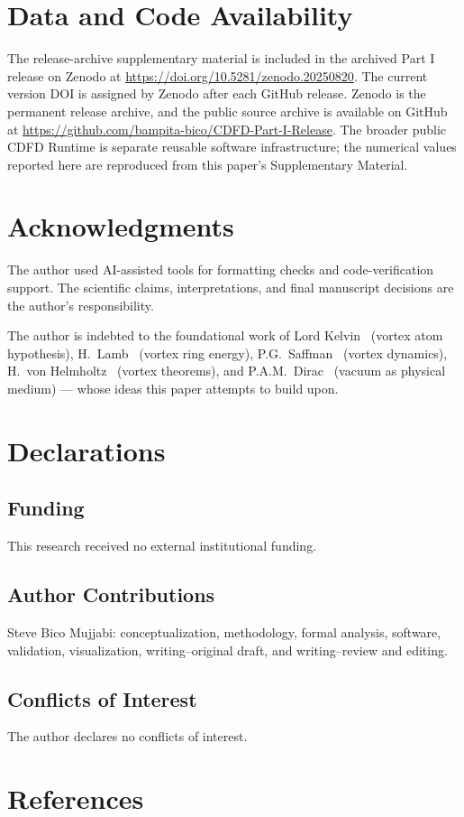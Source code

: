 \documentclass[11pt]{article}
\begin{document}
\section*{Data and Code Availability}

The release-archive supplementary material is included in the archived Part I
release on Zenodo at \url{https://doi.org/10.5281/zenodo.20250820}. The current version DOI is assigned by Zenodo after each GitHub release. Zenodo is the
permanent release archive, and the public source archive is available on GitHub at
\url{https://github.com/bampita-bico/CDFD-Part-I-Release}. The broader public CDFD
Runtime is separate reusable software infrastructure; the numerical values reported
here are reproduced from this paper's Supplementary Material.


\section*{Acknowledgments}
The author used AI-assisted tools for formatting checks and code-verification
support. The scientific claims, interpretations, and final manuscript decisions
are the author's responsibility.

The author is indebted to the foundational work of
Lord Kelvin~\cite{Thomson1867} (vortex atom hypothesis),
H.~Lamb~\cite{Lamb1932} (vortex ring energy),
P.G.~Saffman~\cite{Saffman1992} (vortex dynamics),
H.~von Helmholtz~\cite{Helmholtz1858} (vortex theorems),
and P.A.M.~Dirac~\cite{Dirac1951} (vacuum as physical medium)
--- whose ideas this paper attempts to build upon.

\section*{Declarations}

\subsection*{Funding}
This research received no external institutional funding.

\subsection*{Author Contributions}
Steve Bico Mujjabi: conceptualization, methodology, formal analysis, software,
validation, visualization, writing--original draft, and writing--review and
editing.

\subsection*{Conflicts of Interest}
The author declares no conflicts of interest.

\section*{References}


\end{document}
